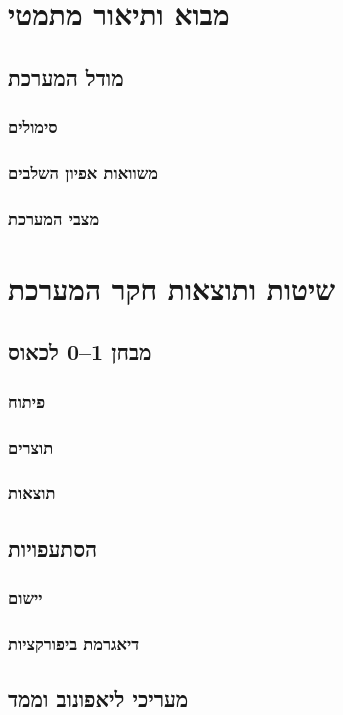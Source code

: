 \documentclass{article}
\begin{document}
\newpage
\section{מבוא ותיאור מתמטי}
\setcounter{subsection}{3}
\subsection{מודל המערכת}
\subsubsection{סימולים}
\subsubsection{משוואות אפיון השלבים}
\subsubsection{מצבי המערכת}

\newpage
\section{שיטות ותוצאות חקר המערכת}
\setcounter{subsection}{4}
\subsection{מבחן 1–0 לכאוס}
\subsubsection{פיתוח}
\subsubsection{תוצרים}
\subsubsection{תוצאות}
\subsection{הסתעפויות}
\subsubsection{יישום}
\subsubsection{דיאגרמת ביפורקציות}
\subsection{מעריכי ליאפונוב וממד}
\end{document}
